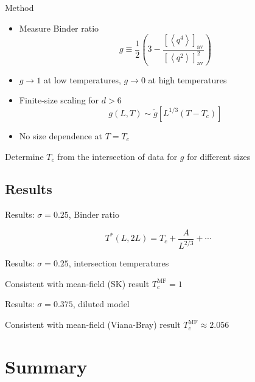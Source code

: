 \documentclass{beamer}
\newcommand{\av}[1]{\left<#1\right>}
\newcommand{\del}[1]{\left(#1\right)}
\newcommand{\sbr}[1]{\left[#1\right]}
\newcommand{\dav}[1]{\sbr{#1}_{\text{av}}}
\begin{document}
\begin{frame}{Method}
  \begin{itemize}
    \item Measure \alert{Binder ratio}
    \begin{equation*}
      g \equiv \frac{1}{2}\del{3 - \frac{\dav{\av{q^4}}}{\dav{\av{q^2}}^2}}
    \end{equation*}
    \item $g \to 1$ at low temperatures, $g \to 0$ at high temperatures
    \item Finite-size scaling for $d>6$
      \begin{equation*}
        g(L,T) \sim \widetilde{g}\sbr{L^{1/3} (T-T_c)}
      \end{equation*}
    \item No size dependence at $T=T_c$
  \end{itemize}
  \alert{Determine $T_c$ from the intersection of data for $g$ for different sizes}
\end{frame}


\subsection{Results}

\begin{frame}{Results: $\sigma=0.25$, Binder ratio}
  \centering
  
  \begin{equation*}
    T^*(L,2L) = T_c + \frac{A}{L^{2/3}} + \cdots
  \end{equation*}
\end{frame}

\begin{frame}{Results: $\sigma=0.25$, intersection temperatures}
  \centering
  \begin{figure}
    
  \end{figure}
  \alert{Consistent with mean-field (SK) result $T_c^{\text{MF}}=1$}
\end{frame}

\begin{frame}{Results: $\sigma=0.375$, diluted model}
  \centering
  \begin{figure}
    
  \end{figure}
  \alert{Consistent with mean-field (Viana-Bray) result $T_c^{\text{MF}} \approx 2.056$}
\end{frame}

\section*{Summary}
\end{document}
